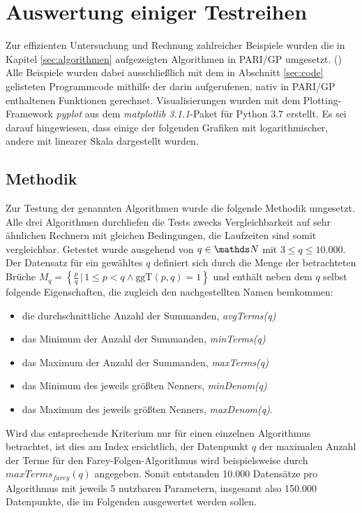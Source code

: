 \section{Auswertung einiger Testreihen}\label{sec:Testreihen}
Zur effizienten Untersuchung und Rechnung zahlreicher Beispiele wurden die in Kapitel \ref{sec:algorithmen} aufgezeigten Algorithmen in PARI/GP umgesetzt. (\cite{PARI2018})\\
Alle Beispiele wurden dabei ausschließlich mit dem in Abschnitt \ref{sec:code} gelisteten Programmcode \bzw mithilfe der darin aufgerufenen, nativ in PARI/GP enthaltenen Funktionen gerechnet.
Visualisierungen wurden mit dem Plotting-Framework \emph{pyplot} aus dem \emph{matplotlib 3.1.1}-Paket für Python 3.7 erstellt. Es sei darauf hingewiesen, dass einige der folgenden Grafiken mit logarithmischer, andere mit linearer Skala dargestellt wurden.

\subsection{Methodik}
Zur Testung der genannten Algorithmen wurde die folgende Methodik umgesetzt.
Alle drei Algorithmen durchliefen die Tests zwecks Vergleichbarkeit auf sehr ähnlichen Rechnern mit gleichen Bedingungen, die Laufzeiten sind somit vergleichbar.
Getestet wurde ausgehend von $q \in \N$ mit $3 \leq q \leq 10.000$.
Der Datensatz für ein gewähltes $q$ definiert sich durch die Menge der betrachteten Brüche $M_q = \left\{ \frac{p}{q} \, | \, 1\leq p < q \wedge \text{ggT}(p,q) = 1\right\}$ und enthält neben dem $q$ selbst folgende Eigenschaften, die zugleich den nachgestellten Namen bemkommen:
\begin{itemize}
	\item die durchschnittliche Anzahl der Summanden, \emph{avgTerms(q)}
	\item das Minimum der Anzahl der Summanden, \emph{minTerms(q)}
	\item das Maximum der Anzahl der Summanden, \emph{maxTerms(q)}
	\item das Minimum des jeweils größten Nenners, \emph{minDenom(q)}
	\item das Maximum des jeweils größten Nenners, \emph{maxDenom(q)}.
\end{itemize}
Wird das entsprechende Kriterium nur für einen einzelnen Algorithmus betrachtet, ist dies am Index ersichtlich, der Datenpunkt $q$ der maximalen Anzahl der Terme für den Farey-Folgen-Algorithmus wird beispielsweise durch $maxTerms_{farey}(q)$ angegeben.
Somit entstanden 10.000 Datensätze pro Algorithmus mit jeweils 5 nutzbaren Parametern, insgesamt also 150.000 Datenpunkte, die im Folgenden ausgewertet werden sollen.

